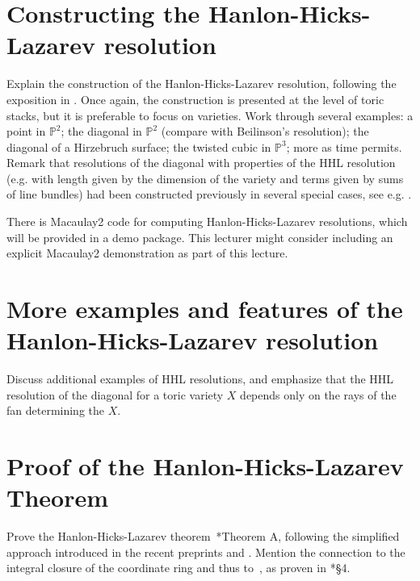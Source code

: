 \documentclass[11pt]{amsart}
\numberwithin{equation}{section}
\theoremstyle{definition}
\theoremstyle{remark}
\newcommand{\PP}{\mathbb P}
\begin{document}

\section{Constructing the Hanlon-Hicks-Lazarev resolution} Explain the construction of the Hanlon-Hicks-Lazarev resolution, following the exposition in \cite{BH25}. Once again, the construction is presented at the level of toric stacks, but it is preferable to focus on varieties. Work through several examples: a point in $\PP^2$; the diagonal in $\PP^2$ (compare with Beilinson's resolution); the diagonal of a Hirzebruch surface; the twisted cubic in $\PP^3$; more as time permits. Remark that resolutions of the diagonal with properties of the HHL resolution (e.g. with length given by the dimension of the variety and terms given by sums of line bundles) had been constructed previously in several special cases, see e.g. \cite{BETate, BPS01, BS24, CK}. 

There is Macaulay2 code for computing Hanlon-Hicks-Lazarev resolutions, which will be provided in a demo package.  This lecturer might consider including an explicit Macaulay2 demonstration as part of this lecture.

\section{More examples and features of the Hanlon-Hicks-Lazarev resolution}

Discuss additional examples of HHL resolutions, and emphasize that the HHL resolution of the diagonal for a toric variety $X$ depends only on the rays of the fan determining the $X$. 

\section{Proof of the Hanlon-Hicks-Lazarev Theorem} Prove the Hanlon-Hicks-Lazarev theorem~\cite{HHL}*{Theorem A}, following the simplified approach introduced in the recent preprints \cite{BCHSY} and \cite{BH25}.  Mention the connection to the integral closure of the coordinate ring and thus to~\cite{BEshort}, as proven in \cite{BCHSY}*{\S4}.




\end{document}
